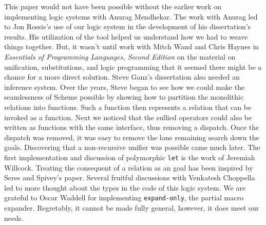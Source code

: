This paper would not have been possible without the earlier work on
implementing logic systems with Anurag Mendhekar.  The work with
Anurag led to Jon Rossie's use of our logic system in the development
of his dissertation's results.  His utilization of the tool helped us
understand how we had to weave things together.  But, it wasn't until
work with Mitch Wand and Chris Haynes in \emph{Essentials of
Programming Languages, Second Edition} on the material on unification,
substitutions, and logic programming that it seemed there might be a
chance for a more direct solution.  Steve Ganz's dissertation also
needed an inference system.  Over the years, Steve began to see how we
could make the seamlessness of Scheme possible by showing how to
partition the monolithic relations into functions.  Such a function
then represents a relation that can be invoked as a function.  Next we
noticed that the sullied operators could also be written as functions
with the same interface, thus removing a dispatch.  Once the dispatch
was removed, it was easy to remove the lone remaining search down the
goals.  Discovering that a non-recursive unifier was possible
came much later.  The first implementation and discussion of
polymorphic \texttt{let} is the work of Jeremiah Willcock.  Treating
the consequent of a relation as an goal has been inspired by
Seres and Spivey's paper.  Several fruitful discussions with Venkatesh
Choppella led to more thought about the types in the code of this
logic system.  We are grateful to Oscar Waddell for implementing
\texttt{expand-only}, the partial macro expander.  Regretably, it
cannot be made fully general, however, it does meet our needs.



